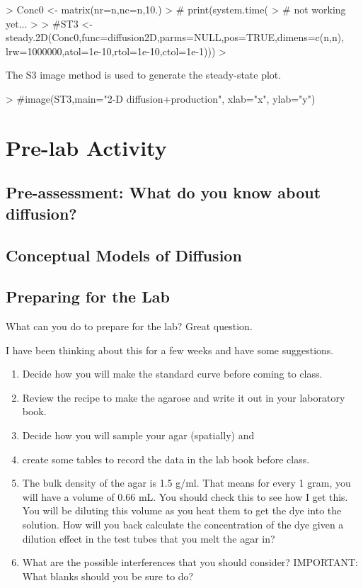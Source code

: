 \documentclass{article}
\begin{document}
\begin{Schunk}
\begin{Sinput}
> Conc0 <- matrix(nr=n,nc=n,10.)
> # print(system.time(
> # not working yet...
> 
> #ST3 <- steady.2D(Conc0,func=diffusion2D,parms=NULL,pos=TRUE,dimens=c(n,n), lrw=1000000,atol=1e-10,rtol=1e-10,ctol=1e-1)))
> 
\end{Sinput}
\end{Schunk}


The S3 image method is used to generate the steady-state plot.

\begin{Schunk}
\begin{Sinput}
> #image(ST3,main="2-D diffusion+production", xlab="x", ylab="y")
\end{Sinput}
\end{Schunk}

\section{Pre-lab Activity}

\subsection{Pre-assessment: What do you know about diffusion?}

\subsection{Conceptual Models of Diffusion}


\subsection{Preparing for the Lab}

What can you do to prepare for the lab?  Great question. 

I have been thinking about this for a few weeks and have some suggestions.

\begin{enumerate}
	\item Decide how you will make the standard curve before coming to class.
	\item Review the recipe to make the agarose and write it out in your laboratory book.
	\item Decide how you will sample your agar (spatially) and 
	\item create some tables to record the data in the lab book before class.

	\item The bulk density of the agar is 1.5 g/ml. That means for every 1 gram, you will have a volume of 0.66 mL.  You should check this to see how I get this.  You will be diluting this volume as you heat them to get the dye into the solution. How will you back calculate the concentration of the dye given a dilution effect in the test tubes that  you melt the agar in?

	\item What are the possible interferences that you should consider?  IMPORTANT: What blanks should you be sure to do?
\end{enumerate}
\end{document}
